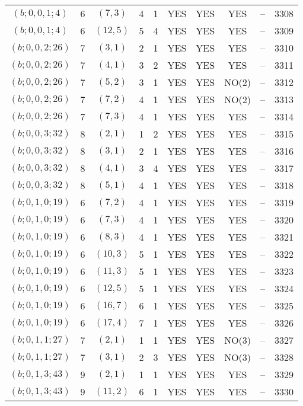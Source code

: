 \begin{longtable}{|c|c|c|c|c|c|c|c|c|c|}
$(b; 0, 0, 1; 4)$ & 6 & $(7, 3)$ & 4 & 1 & YES & YES & YES & -- & 3308\\
$(b; 0, 0, 1; 4)$ & 6 & $(12, 5)$ & 5 & 4 & YES & YES & YES & -- & 3309\\
$(b; 0, 0, 2; 26)$ & 7 & $(3, 1)$ & 2 & 1 & YES & YES & YES & -- & 3310\\
$(b; 0, 0, 2; 26)$ & 7 & $(4, 1)$ & 3 & 2 & YES & YES & YES & -- & 3311\\
$(b; 0, 0, 2; 26)$ & 7 & $(5, 2)$ & 3 & 1 & YES & YES & NO(2) & -- & 3312\\
$(b; 0, 0, 2; 26)$ & 7 & $(7, 2)$ & 4 & 1 & YES & YES & NO(2) & -- & 3313\\
$(b; 0, 0, 2; 26)$ & 7 & $(7, 3)$ & 4 & 1 & YES & YES & YES & -- & 3314\\
$(b; 0, 0, 3; 32)$ & 8 & $(2, 1)$ & 1 & 2 & YES & YES & YES & -- & 3315\\
$(b; 0, 0, 3; 32)$ & 8 & $(3, 1)$ & 2 & 1 & YES & YES & YES & -- & 3316\\
$(b; 0, 0, 3; 32)$ & 8 & $(4, 1)$ & 3 & 4 & YES & YES & YES & -- & 3317\\
$(b; 0, 0, 3; 32)$ & 8 & $(5, 1)$ & 4 & 1 & YES & YES & YES & -- & 3318\\
$(b; 0, 1, 0; 19)$ & 6 & $(7, 2)$ & 4 & 1 & YES & YES & YES & -- & 3319\\
$(b; 0, 1, 0; 19)$ & 6 & $(7, 3)$ & 4 & 1 & YES & YES & YES & -- & 3320\\
$(b; 0, 1, 0; 19)$ & 6 & $(8, 3)$ & 4 & 1 & YES & YES & YES & -- & 3321\\
$(b; 0, 1, 0; 19)$ & 6 & $(10, 3)$ & 5 & 1 & YES & YES & YES & -- & 3322\\
$(b; 0, 1, 0; 19)$ & 6 & $(11, 3)$ & 5 & 1 & YES & YES & YES & -- & 3323\\
$(b; 0, 1, 0; 19)$ & 6 & $(12, 5)$ & 5 & 1 & YES & YES & YES & -- & 3324\\
$(b; 0, 1, 0; 19)$ & 6 & $(16, 7)$ & 6 & 1 & YES & YES & YES & -- & 3325\\
$(b; 0, 1, 0; 19)$ & 6 & $(17, 4)$ & 7 & 1 & YES & YES & YES & -- & 3326\\
$(b; 0, 1, 1; 27)$ & 7 & $(2, 1)$ & 1 & 1 & YES & YES & NO(3) & -- & 3327\\
$(b; 0, 1, 1; 27)$ & 7 & $(3, 1)$ & 2 & 3 & YES & YES & NO(3) & -- & 3328\\
$(b; 0, 1, 3; 43)$ & 9 & $(2, 1)$ & 1 & 1 & YES & YES & YES & -- & 3329\\
$(b; 0, 1, 3; 43)$ & 9 & $(11, 2)$ & 6 & 1 & YES & YES & YES & -- & 3330\\

\end{longtable}
